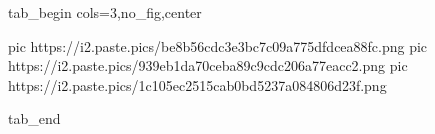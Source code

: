  
 
 
 
 


\ifcmt
  tab_begin cols=3,no_fig,center

     pic https://i2.paste.pics/be8b56cdc3e3bc7c09a775dfdcea88fc.png
		 pic https://i2.paste.pics/939eb1da70ceba89c9cdc206a77eacc2.png
		 pic https://i2.paste.pics/1c105ec2515cab0bd5237a084806d23f.png

  tab_end
\fi
